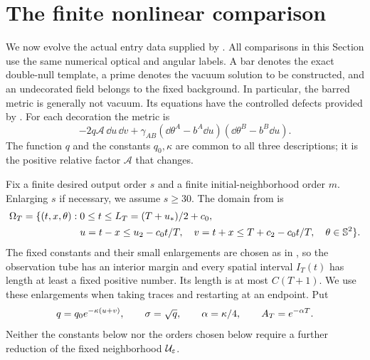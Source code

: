 \section{The finite nonlinear comparison}\label{sec:dn-comparison}

We now evolve the actual entry data supplied by
.  All comparisons in this Section use the
same numerical optical and angular labels.  A bar denotes the exact
double-null template, a prime denotes the vacuum solution to be
constructed, and an undecorated field belongs to the fixed background.
In particular, the barred metric is generally not vacuum.  Its equations
have the controlled defects provided by .
For each decoration the metric is
\[
 -2q\mathcal A\,\dd u\,\dd v+
   \gamma_{AB}(\dd\theta^A-b^A\dd u)(\dd\theta^B-b^B\dd u).
\]
The function $q$ and the constants $q_0,\kappa$ are common to all
three descriptions; it is the positive relative factor $\mathcal A$
that changes.

Fix a finite desired output order $s$ and a finite initial-neighborhood
order $m$.  Enlarging $s$ if necessary, we assume $s\ge30$.  The domain
from  is
\begin{equation}\label{dn:domain}
\begin{split}
 \Omega_T=\{(t,x,\theta):\;&0\le t\le L_T=(T+u_*)/2+c_0,\\
 &u=t-x\le u_2-c_0t/T,\quad
 v=t+x\le T+c_2-c_0t/T,\quad\theta\in\mathbb S^2\}.
\end{split}
\end{equation}
The fixed constants and their small enlargements are chosen as in
, so the observation tube has an interior
margin and every spatial interval $I_T(t)$ has length at least a fixed
positive number.  Its length is at most $C(T+1)$.  We use these
enlargements when taking traces and restarting at an endpoint.  Put
\[
 q=q_0e^{-\kappa(u+v)},\qquad \sigma=\sqrt q,
 \qquad \alpha=\kappa/4,\qquad A_T=e^{-\alpha T}.
\]
Neither the constants below nor the orders chosen below require a
further reduction of the fixed neighborhood $\mathcal U_{\varepsilon}$.

